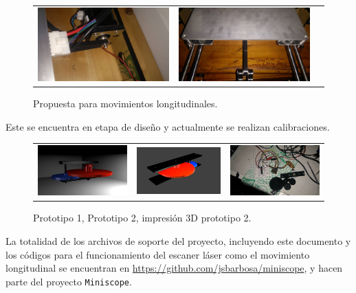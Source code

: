 \documentclass[11pt]{article}
\begin{document}
	\begin{figure}[h]
		\centering
		\begin{tabular}{ccc}
			\includegraphics[width=0.4\linewidth]{correa1.jpg} &
			\includegraphics[width=0.4\linewidth]{correa2.jpg} &
		\end{tabular}
		\caption{Propuesta para movimientos longitudinales.}
	\end{figure}
	
	Este se encuentra en etapa de diseño y actualmente se realizan calibraciones.
	\begin{figure}[h]
		\centering
		\begin{tabular}{ccc}
			\includegraphics[width=0.3\linewidth]{rendered.png} &
			\includegraphics[width=0.3\linewidth]{rendered2.png} &
			\includegraphics[width=0.3\linewidth]{motoreductor.jpg}
		\end{tabular}
		\caption{Prototipo 1, Prototipo 2, impresión 3D prototipo 2.}
	\end{figure}
	
	\newpage
	\nocite{*}
	
	
	
	La totalidad de los archivos de soporte del proyecto, incluyendo este documento y los códigos para el funcionamiento del escaner láser como el movimiento longitudinal se encuentran en \url{https://github.com/jsbarbosa/miniscope}, y hacen parte del proyecto \texttt{Miniscope}.
\end{document}
